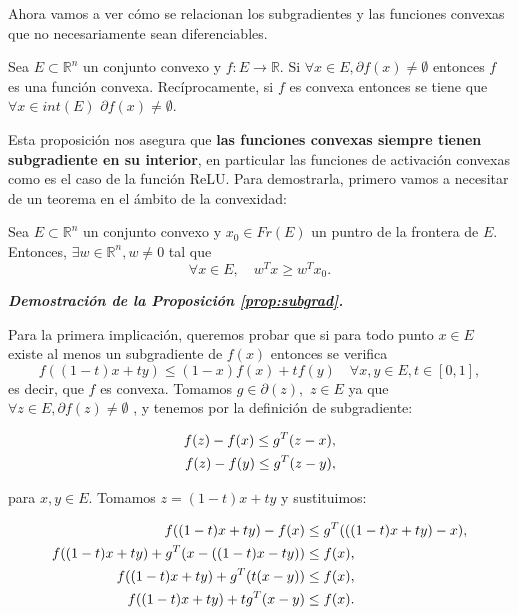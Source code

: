 Ahora vamos a ver cómo se relacionan los subgradientes y las funciones convexas que no necesariamente sean diferenciables.



\begin{proposicion}
\label{prop:subgrad}
    Sea $E \subset \mathbb{R}^n$ un conjunto convexo y $f:E \rightarrow \mathbb{R}$. Si $\forall x \in E, \partial f(x) \neq \emptyset$ entonces $f$ es una función convexa. Recíprocamente, si $f$ es convexa  entonces se tiene que $\forall x \in int(E)$ $\partial f(x) \neq \emptyset$.
\end{proposicion}

Esta proposición nos asegura que \textbf{las funciones convexas siempre tienen subgradiente en su interior}, en particular las funciones de activación convexas como es el caso de la función ReLU. Para demostrarla, primero vamos a necesitar de un teorema en el ámbito de la convexidad:

\begin{teorema}
    Sea $E \subset \mathbb{R}^n$ un conjunto convexo y $x_0 \in Fr(E)$ un puntro de la frontera de $E$. Entonces, $\exists w \in \mathbb{R}^n, w \neq 0$ tal que
    $$\forall x \in E, \quad w^Tx \geq w^T x_0.$$
\end{teorema}

\vspace{1cm}


\begin{flushleft}
   \textbf{\textit{Demostración de la Proposición \ref{prop:subgrad}.}}
\end{flushleft} 
Para la primera implicación, queremos probar que si para todo punto $x \in E$ existe al menos un subgradiente de $f(x)$ entonces se verifica
$$f((1-t)x+ty) \leq (1-x)f(x)+tf(y) \quad \forall x,y \in E, t \in [0,1],$$
es decir, que $f$ es convexa. Tomamos $g \in \partial(z),$ $z \in E$ ya que $\forall z \in E,  \partial f(z) \neq \emptyset $ , y tenemos por la definición de subgradiente:

\begin{align}
	f(z) - f(x) \leq g^T(z-x), \notag \\
	f(z) - f(y) \leq g^T(z-y), \label{eq:des2}
\end{align}

para $x,y \in E$. Tomamos $z=(1-t)x + ty$ y sustituimos:

\begin{align}	
	f((1-t)x + ty) - f(x) &\leq g^T(((1-t)x + ty)-x), \notag \\
	f((1-t)x + ty) + g^T(x - ((1-t)x-ty)) &\leq f(x), \notag \\
	f((1-t)x + ty) + g^T(t(x-y)) &\leq f(x), \notag \\
	f((1-t)x + ty) + tg^T(x-y) &\leq f(x). \label{proof1:f(x)}
\end{align}


